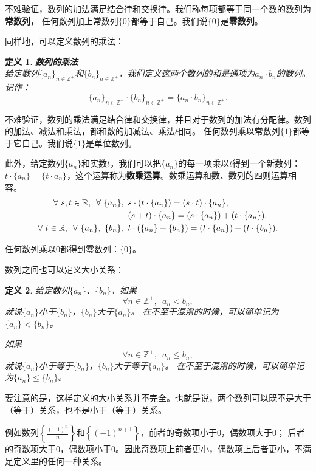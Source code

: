 \documentclass[12pt,UTF8]{ctexbook}
\newtheorem{df}{定义}[section]
\begin{document}
不难验证，数列的加法满足结合律和交换律。我们称每项都等于同一个数的数列为\textbf{常数列}，
任何数列加上常数列$\{0\}$都等于自己。我们说$\{0\}$是\textbf{零数列}。

同样地，可以定义数列的乘法：
\begin{df}\textbf{数列的乘法}\\
    给定数列$\{a_n\}_{n\in\mathbb{Z}^+}$和$\{b_n\}_{n\in\mathbb{Z}^+}$，我们定义这两个数列的和是通项为$a_n \cdot b_n$的数列。
    记作：
    $$ \{a_n\}_{n\in\mathbb{Z}^+} \cdot \{b_n\}_{n\in\mathbb{Z}^+} = \{a_n \cdot b_n\}_{n\in\mathbb{Z}^+}.$$    
\end{df}

不难验证，数列的乘法满足结合律和交换律，并且对于数列的加法有分配律。数列的加法、减法和乘法，都和数的加减法、乘法相同。
任何数列乘以常数列$\{1\}$都等于它自己。我们说$\{1\}$是单位数列。

此外，给定数列$\{a_n\}$和实数$t$，我们可以把$\{a_n\}$的每一项乘以$t$得到一个新数列：
$t\cdot \{a_n\} = \{t\cdot a_n\}$，这个运算称为\textbf{数乘运算}。数乘运算和数、数列的四则运算相容。
\begin{align}
    \forall  \,\, s, t \in \mathbb{R}, \,\,\, \forall \,\, \{a_n\}, \,\,\,& s \cdot (t\cdot \{a_n\}) = (s\cdot t)\cdot \{a_n\}, \notag \\
    & (s + t) \cdot \{a_n\} = (s\cdot \{a_n\}) + (t\cdot \{a_n\}). \notag \\
    \forall  \,\, t \in \mathbb{R}, \,\,\, \forall \,\, \{a_n\}, \,\, \{b_n\},\,\,\, & t \cdot (\{a_n\} + \{b_n\}) = (t \cdot \{a_n\}) + (t \cdot \{b_n\}). \notag 
\end{align}

任何数列乘以$0$都得到零数列：$\{0\}$。

数列之间也可以定义大小关系：
\begin{df}
    给定数列$\{a_n\}$、$\{b_n\}$，如果
    $$ \forall n\in \mathbb{Z}^+, \,\,\, a_n < b_n,$$
    就说$\{a_n\}$小于$\{b_n\}$，$\{b_n\}$大于$\{a_n\}$。
    在不至于混淆的时候，可以简单记为$\{a_n\} < \{b_n\}$。
    
    如果
    $$ \forall n\in \mathbb{Z}^+, \,\,\, a_n \leqslant b_n,$$
    就说$\{a_n\}$小于等于$\{b_n\}$，$\{b_n\}$大于等于$\{a_n\}$。
    在不至于混淆的时候，可以简单记为$\{a_n\} \leqslant \{b_n\}$。
\end{df}


要注意的是，这样定义的大小关系并不完全。也就是说，两个数列可以既不是大于（等于）关系，也不是小于（等于）关系。

例如数列$\left\{\frac{(-1)^n}{n}\right\}$和$\left\{(-1)^{n+1}\right\}$，前者的奇数项小于$0$，偶数项大于$0$；
后者的奇数项大于$0$，偶数项小于$0$。因此奇数项上前者更小，偶数项上后者更小，不满足定义里的任何一种关系。
\end{document}
